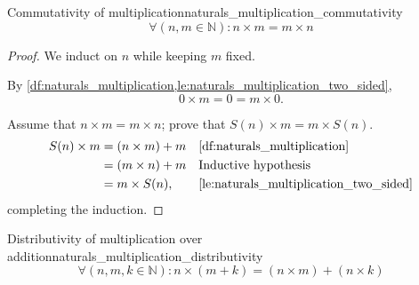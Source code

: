 \begin{lemma}{Commutativity of multiplication}{naturals_multiplication_commutativity}
  \begin{equation*}
    \forall (n, m \in \mathbb{N}) : n \times m = m \times n
  \end{equation*}
\end{lemma}
\begin{proof}
  We induct on \(n\) while keeping \(m\) fixed.

  \basecase By \cref{df:naturals_multiplication,le:naturals_multiplication_two_sided},
  \begin{equation}
    0 \times m = 0 = m \times 0.
  \end{equation}

  \inductivestep Assume that \(n \times m = m \times n\); prove that
  \(S(n) \times m = m \times S(n)\).
  \begin{align}
    S(n) \times m & = (n \times m) + m &  & \textrm{\Cref{df:naturals_multiplication}}           \\
                  & = (m \times n) + m &  & \textrm{Inductive hypothesis}                        \\
                  & = m \times S(n),   &  & \textrm{\Cref{le:naturals_multiplication_two_sided}}
  \end{align}
  completing the induction.
\end{proof}

\begin{lemma}{Distributivity of multiplication over addition}{naturals_multiplication_distributivity}
  \begin{equation*}
    \forall (n, m, k \in \mathbb{N}) : n \times (m + k) = (n \times m) + (n \times k)
  \end{equation*}
\end{lemma}

